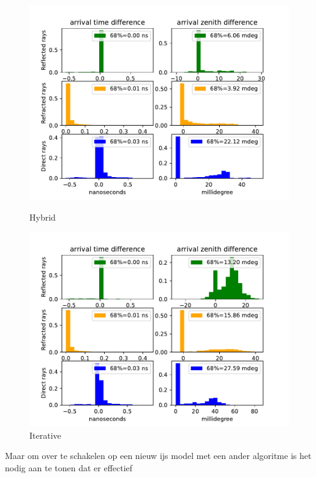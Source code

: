 \begin{figure}
	\centering
\begin{minipage}{0.49\textwidth}
	\includegraphics[width=1.1\textwidth]{figures/hybrid_comparison_N_1000.pdf}
	\caption{Hybrid}
	\label{fig:SamHyb}
\end{minipage}
\begin{minipage}{0.49\textwidth}
	\includegraphics[width=1.1\textwidth]{figures/iterative_comparison_N_1000.pdf}
	\caption{Iterative}
	\label{fig:Samit}
\end{minipage}
\end{figure}
\newpage
Maar om over te schakelen op een nieuw ijs model met een ander algoritme is het nodig aan te tonen dat er effectief
